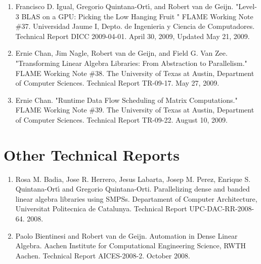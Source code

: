 \begin{enumerate}
\item
      Francisco D. Igual, Gregorio Quintana-Ort\'{\i}, and Robert van de Geijn. "Level-3 BLAS on a GPU: Picking the Low Hanging Fruit " FLAME Working Note \#37. Universidad Jaume I, Depto. de Ingenieria y Ciencia de Computadores. Technical Report DICC 2009-04-01. April 30, 2009, Updated May 21, 2009.

\item
      Ernie Chan, Jim Nagle, Robert van de Geijn, and Field G. Van Zee. "Transforming Linear Algebra Libraries: From Abstraction to Parallelism." FLAME Working Note \#38. The University of Texas at Austin, Department of Computer Sciences. Technical Report TR-09-17. May 27, 2009. 

\item
      Ernie Chan. "Runtime Data Flow Scheduling of Matrix Computations." FLAME Working Note \#39. The University of Texas at Austin, Department of Computer Sciences. Technical Report TR-09-22. August 10, 2009. 
\end{enumerate}

\section{Other Technical Reports}

\renewcommand\labelenumi{R\theenumi}

\begin{enumerate}
\item
      Rosa M. Badia, Jose R. Herrero, Jesus Labarta, Josep M. Perez, Enrique S. Quintana-Ort\'{\i} and Gregorio Quintana-Orti. Parallelizing dense and banded linear algebra libraries using SMPSs. Departament of Computer Architecture, Universitat Politecnica de Catalunya. Technical Report UPC-DAC-RR-2008-64. 2008.
\item
Paolo Bientinesi and Robert van de Geijn. 
Automation in Dense Linear Algebra.
Aachen Institute for Computational Engineering Science, RWTH Aachen. Technical Report AICES-2008-2. October 2008.
\end{enumerate}

\renewcommand\labelenumi{\theenumi}
